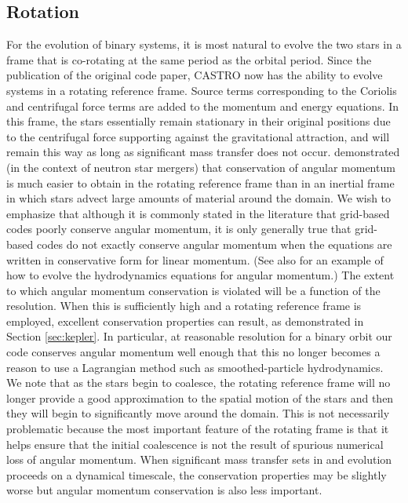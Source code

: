 \documentclass[iop]{emulateapj}
\begin{document}
\subsection{Rotation}\label{sec:rotation}

For the evolution of binary systems, it is most natural to evolve the
two stars in a frame that is co-rotating at the same period as the
orbital period. Since the publication of the original code paper, CASTRO 
now has the ability to evolve systems in a rotating reference frame. 
Source terms corresponding to the Coriolis and centrifugal 
force terms are added to the momentum and energy equations. In this frame, 
the stars essentially remain stationary in their original positions due to the
centrifugal force supporting against the gravitational attraction, and
will remain this way as long as significant mass transfer does not
occur. \cite{swc:2000} demonstrated (in the context of neutron star
mergers) that conservation of angular momentum is much easier to
obtain in the rotating reference frame than in an inertial frame in
which stars advect large amounts of material around the domain. We
wish to emphasize that although it is commonly stated in the
literature that grid-based codes poorly conserve angular momentum,
it is only generally true that grid-based codes do not exactly conserve 
angular momentum when the equations are written in conservative form
for linear momentum. (See also \cite{motl:2002} for an example of how 
to evolve the hydrodynamics equations for angular momentum.) 
The extent to which angular momentum conservation is violated
will be a function of the resolution. When this is sufficiently high
and a rotating reference frame is employed, excellent conservation
properties can result, as demonstrated in Section \ref{sec:kepler}. 
In particular, at reasonable resolution for a binary orbit our code 
conserves angular momentum well enough that this no longer becomes 
a reason to use a Lagrangian method such as smoothed-particle hydrodynamics.
We note that as the stars begin to coalesce, the rotating reference frame
will no longer provide a good approximation to the spatial motion of
the stars and then they will begin to significantly move around the
domain. This is not necessarily problematic because the most important
feature of the rotating frame is that it helps ensure that the initial
coalescence is not the result of spurious numerical loss of angular
momentum. When significant mass transfer sets in and evolution
proceeds on a dynamical timescale, the conservation properties may be
slightly worse but angular momentum conservation is also less
important.
\end{document}
